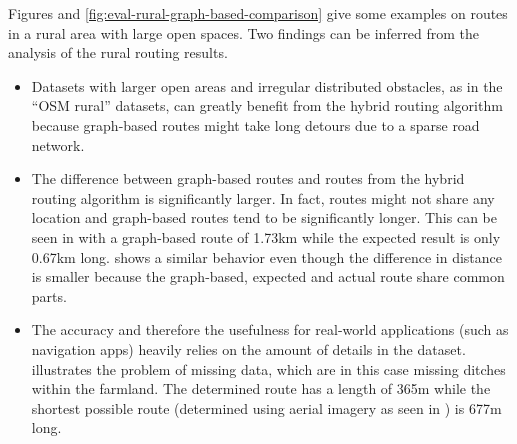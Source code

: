			
			Figures  and \ref{fig:eval-rural-graph-based-comparison} give some examples on routes in a rural area with large open spaces.
			Two findings can be inferred from the analysis of the rural routing results.
			
			\begin{itemize}
				\item Datasets with larger open areas and irregular distributed obstacles, as in the \enquote{OSM rural} datasets, can greatly benefit from the hybrid routing algorithm because graph-based routes might take long detours due to a sparse road network.
				\item The difference between graph-based routes and routes from the hybrid routing algorithm is significantly larger.
				In fact, routes might not share any location and graph-based routes tend to be significantly longer.
				This can be seen in  with a graph-based route of 1.73km while the expected result is only 0.67km long.
				 shows a similar behavior even though the difference in distance is smaller because the graph-based, expected and actual route share common parts.
				\item The accuracy and therefore the usefulness for real-world applications (such as navigation apps) heavily relies on the amount of details in the dataset.
				 illustrates the problem of missing data, which are in this case missing ditches within the farmland.
				The determined route has a length of 365m while the shortest possible route (determined using aerial imagery as seen in ) is 677m long.
			\end{itemize}
			
